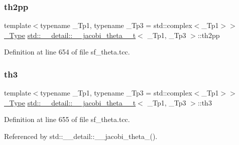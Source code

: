 \subsubsection{\texorpdfstring{th2pp}{th2pp}}
{\footnotesize\ttfamily template$<$typename \+\_\+\+Tp1, typename \+\_\+\+Tp3 = std\+::complex$<$\+\_\+\+Tp1$>$$>$ \\
\hyperlink{structstd_1_1____detail_1_1____jacobi__theta__0__t_a4aebcbdd8f3ab416a2fa770aa3784d63}{\+\_\+\+Type} \hyperlink{structstd_1_1____detail_1_1____jacobi__theta__0__t}{std\+::\+\_\+\+\_\+detail\+::\+\_\+\+\_\+jacobi\+\_\+theta\+\_\+\_\+t}$<$ \+\_\+\+Tp1, \+\_\+\+Tp3 $>$\+::th2pp}



Definition at line 654 of file sf\+\_\+theta.\+tcc.

\mbox{\label{structstd_1_1____detail_1_1____jacobi__theta__0__t_ab3ce6804b7c7c088895fb9f8a92c8f87}} 
\subsubsection{\texorpdfstring{th3}{th3}}
{\footnotesize\ttfamily template$<$typename \+\_\+\+Tp1, typename \+\_\+\+Tp3 = std\+::complex$<$\+\_\+\+Tp1$>$$>$ \\
\hyperlink{structstd_1_1____detail_1_1____jacobi__theta__0__t_a4aebcbdd8f3ab416a2fa770aa3784d63}{\+\_\+\+Type} \hyperlink{structstd_1_1____detail_1_1____jacobi__theta__0__t}{std\+::\+\_\+\+\_\+detail\+::\+\_\+\+\_\+jacobi\+\_\+theta\+\_\+\_\+t}$<$ \+\_\+\+Tp1, \+\_\+\+Tp3 $>$\+::th3}



Definition at line 655 of file sf\+\_\+theta.\+tcc.



Referenced by std\+::\+\_\+\+\_\+detail\+::\+\_\+\+\_\+jacobi\+\_\+theta\+\_().

\mbox{\label{structstd_1_1____detail_1_1____jacobi__theta__0__t_a5f35037ad2ba098c9d4583d11f00a881}} 
